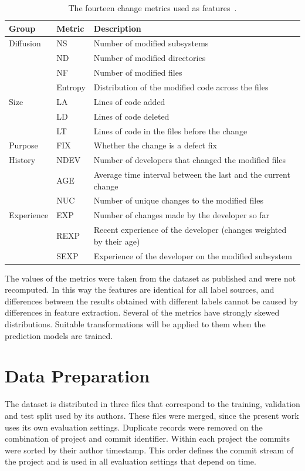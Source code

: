 \documentclass[12pt,a4paper,oneside]{report}
\begin{document}
\begin{table}[htbp]
\centering\small
\caption{The fourteen change metrics used as features~\cite{kamei2013jit}.}
\label{tab:metrics}
\begin{tabularx}{\linewidth}{@{}llX@{}}
\toprule
Group & Metric & Description \\
\midrule
Diffusion & NS & Number of modified subsystems \\
 & ND & Number of modified directories \\
 & NF & Number of modified files \\
 & Entropy & Distribution of the modified code across the files \\
\midrule
Size & LA & Lines of code added \\
 & LD & Lines of code deleted \\
 & LT & Lines of code in the files before the change \\
\midrule
Purpose & FIX & Whether the change is a defect fix \\
\midrule
History & NDEV & Number of developers that changed the modified files \\
 & AGE & Average time interval between the last and the current change \\
 & NUC & Number of unique changes to the modified files \\
\midrule
Experience & EXP & Number of changes made by the developer so far \\
 & REXP & Recent experience of the developer (changes weighted by their age) \\
 & SEXP & Experience of the developer on the modified subsystem \\
\bottomrule
\end{tabularx}
\end{table}

The values of the metrics were taken from the dataset as published and were
not recomputed. In this way the features are identical for all label sources,
and differences between the results obtained with different labels cannot be
caused by differences in feature extraction. Several of the metrics have
strongly skewed distributions. Suitable transformations will be applied to
them when the prediction models are trained.

\section{Data Preparation}

The dataset is distributed in three files that correspond to the training,
validation and test split used by its authors. These files were merged, since
the present work uses its own evaluation settings. Duplicate records were
removed on the combination of project and commit identifier. Within each
project the commits were sorted by their author timestamp. This order defines
the commit stream of the project and is used in all evaluation settings that
depend on time.
\end{document}
